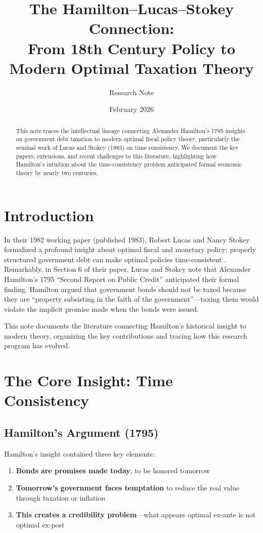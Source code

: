 \documentclass[12pt]{article}
\title{The Hamilton--Lucas--Stokey Connection: \\
From 18th Century Policy to Modern Optimal Taxation Theory}
\author{Research Note}
\date{February 2026}
\begin{document}
\maketitle

\begin{abstract}
This note traces the intellectual lineage connecting Alexander Hamilton's 1795 insights on government debt taxation to modern optimal fiscal policy theory, particularly the seminal work of Lucas and Stokey (1983) on time consistency. We document the key papers, extensions, and recent challenges to this literature, highlighting how Hamilton's intuition about the time-consistency problem anticipated formal economic theory by nearly two centuries.
\end{abstract}

\section{Introduction}

In their 1982 working paper (published 1983), Robert Lucas and Nancy Stokey formalized a profound insight about optimal fiscal and monetary policy: properly structured government debt can make optimal policies time-consistent \citep{lucas_stokey_1982, lucas_stokey_1983}. Remarkably, in Section 6 of their paper, Lucas and Stokey note that Alexander Hamilton's 1795 ``Second Report on Public Credit'' \citep{hamilton_1795} anticipated their formal finding. Hamilton argued that government bonds should not be taxed because they are ``property subsisting in the faith of the government''---taxing them would violate the implicit promise made when the bonds were issued.

This note documents the literature connecting Hamilton's historical insight to modern theory, organizing the key contributions and tracing how this research program has evolved.

\section{The Core Insight: Time Consistency}

\subsection{Hamilton's Argument (1795)}

Hamilton's insight contained three key elements:
\begin{enumerate}[noitemsep]
\item \textbf{Bonds are promises made today}, to be honored tomorrow
\item \textbf{Tomorrow's government faces temptation} to reduce the real value through taxation or inflation
\item \textbf{This creates a credibility problem}---what appears optimal ex-ante is not optimal ex-post
\end{enumerate}
\end{document}
